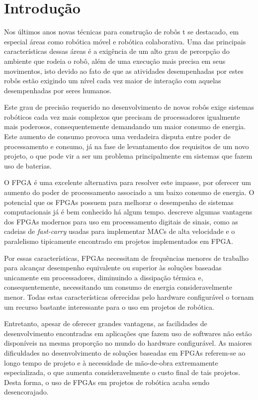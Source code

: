 \chapter{Introdução}\label{cap:intro}

Nos últimos anos novas técnicas para construção de robôs t se destacado, em especial áreas como robótica móvel e robótica colaborativa. Uma das principais características dessas áreas é a exigência de um alto grau de percepção do ambiente que rodeia o robô, além de uma execução mais precisa em seus movimentos, isto devido ao fato de que as atividades desempenhadas por estes robôs estão exigindo um nível cada vez maior de interação com aquelas desempenhadas por seres humanos.

Este grau de precisão requerido no desenvolvimento de novos robôs exige sistemas robóticos cada vez mais complexos que precisam de processadores igualmente mais poderosos, consequentemente demandando um maior consumo de energia. Este aumento de consumo provoca uma verdadeira disputa entre poder de processamento e consumo, já na fase de levantamento dos requisitos de um novo projeto, o que pode vir a ser um problema principalmente em sistemas que fazem uso de baterias. 

O FPGA é uma excelente alternativa para resolver este impasse, por oferecer um aumento do poder de processamento associado a um baixo consumo de energia. O potencial que os FPGAs possuem para melhorar o desempenho de sistemas computacionais já é bem conhecido há algum tempo.  descreve algumas vantagens dos FPGAs modernos para uso em processamento digitais de sinais, como as cadeias de \textit{fast-carry} usadas para implementar MACs de alta velocidade e o paralelismo tipicamente encontrado em projetos implementados em FPGA\@. 

Por essas características, FPGAs necessitam de frequências menores de trabalho para alcançar desempenho equivalente ou superior às soluções baseadas unicamente em processadores, diminuindo a dissipação térmica e, consequentemente, necessitando um consumo de energia consideravelmente menor. Todas estas características oferecidas pelo hardware configurável o tornam um recurso bastante interessante para o uso em projetos de robótica.

Entretanto, apesar de oferecer grandes vantagens, as facilidades de desenvolvimento encontradas em aplicações que fazem uso de softwares não estão disponíveis na mesma proporção no mundo do hardware configurável. As maiores dificuldades no desenvolvimento de soluções baseadas em FPGAs referem-se ao longo tempo de projeto e à necessidade de mão-de-obra extremamente especializada, o que aumenta consideravelmente o custo final de tais projetos. Desta forma, o uso de FPGAs em projetos de robótica acaba sendo desencorajado.

